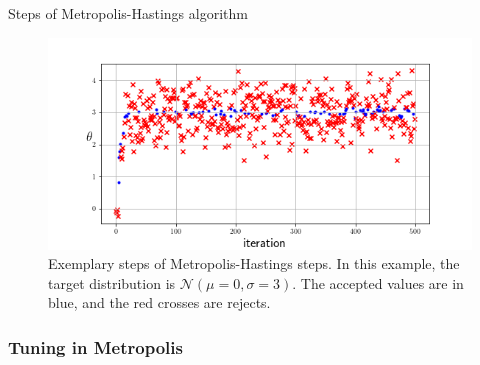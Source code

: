 
\begin{algorithm}[ht]
\caption{Steps of Metropolis-Hastings algorithm }
\label{alg:metropolis}
\end{algorithm}






\begin{figure}[ht]
  \centering
  \includegraphics[width=0.8\linewidth]{figures/chapter3/random_walk.png}
  \caption{ Exemplary steps of Metropolis-Hastings steps. In this example, the target distribution is $\mathcal{N}(\mu=0, \sigma=3)$. The accepted values are in blue, and the red crosses are rejects.}
  \label{fig:random_walk}
\end{figure}


\subsubsection{Tuning in Metropolis}
\label{chap3:tuning_metropolis}

